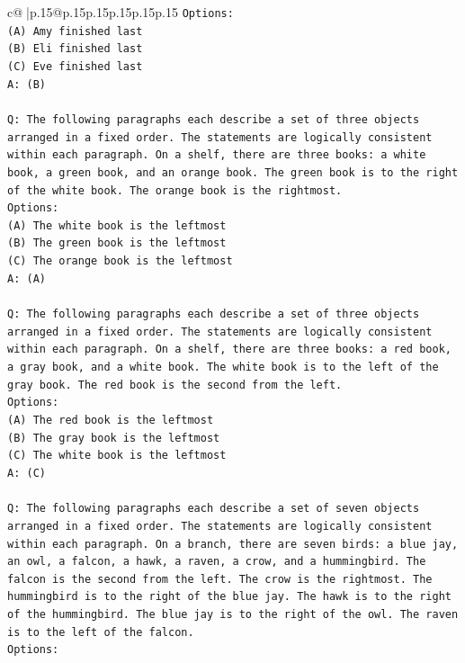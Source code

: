\documentclass{article}
\begin{document}
{\begin{supertabular}{c@{$\;$}|p{.15\linewidth}@{}p{.15\linewidth}p{.15\linewidth}p{.15\linewidth}p{.15\linewidth}p{.15\linewidth}}
{{{\texttt{Options:} \\
\texttt{(A) Amy finished last} \\
\texttt{(B) Eli finished last} \\
\texttt{(C) Eve finished last} \\
\texttt{A: (B)} \\
\\ 
\texttt{Q: The following paragraphs each describe a set of three objects arranged in a fixed order. The statements are logically consistent within each paragraph. On a shelf, there are three books: a white book, a green book, and an orange book. The green book is to the right of the white book. The orange book is the rightmost.} \\
\texttt{Options:} \\
\texttt{(A) The white book is the leftmost} \\
\texttt{(B) The green book is the leftmost} \\
\texttt{(C) The orange book is the leftmost} \\
\texttt{A: (A)} \\
\\ 
\texttt{Q: The following paragraphs each describe a set of three objects arranged in a fixed order. The statements are logically consistent within each paragraph. On a shelf, there are three books: a red book, a gray book, and a white book. The white book is to the left of the gray book. The red book is the second from the left.} \\
\texttt{Options:} \\
\texttt{(A) The red book is the leftmost} \\
\texttt{(B) The gray book is the leftmost} \\
\texttt{(C) The white book is the leftmost} \\
\texttt{A: (C)} \\
\\ 
\texttt{Q: The following paragraphs each describe a set of seven objects arranged in a fixed order. The statements are logically consistent within each paragraph. On a branch, there are seven birds: a blue jay, an owl, a falcon, a hawk, a raven, a crow, and a hummingbird. The falcon is the second from the left. The crow is the rightmost. The hummingbird is to the right of the blue jay. The hawk is to the right of the hummingbird. The blue jay is to the right of the owl. The raven is to the left of the falcon.} \\
\texttt{Options:} \\
}}}
\end{supertabular}}
\end{document}
